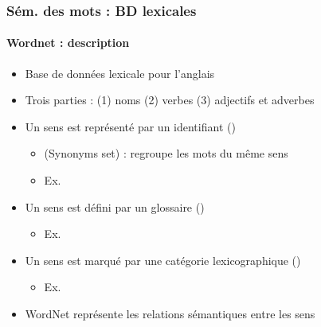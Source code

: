 \documentclass[xcolor=table]{beamer}
\begin{document}
\begin{frame}
\frametitle{Sém. des mots : BD lexicales}
\framesubtitle{Wordnet : description}
	
\begin{itemize}
	\item Base de données lexicale pour l'anglais \cite{1995-miller}
	\item Trois parties : (1) noms (2) verbes (3) adjectifs et adverbes
	\item Un sens est représenté par un identifiant ()
	\begin{itemize}
		\item {} (Synonyms set) : regroupe les mots du même sens 
		\item Ex. 
	\end{itemize}
	\item Un sens est défini par un glossaire ()
	\begin{itemize}
		\item Ex. 
	\end{itemize}
	\item Un sens est marqué par une catégorie lexicographique ()
	\begin{itemize}
		\item Ex. 
	\end{itemize}
	\item WordNet représente les relations sémantiques entre les sens
\end{itemize}
	
\end{frame}
\end{document}
